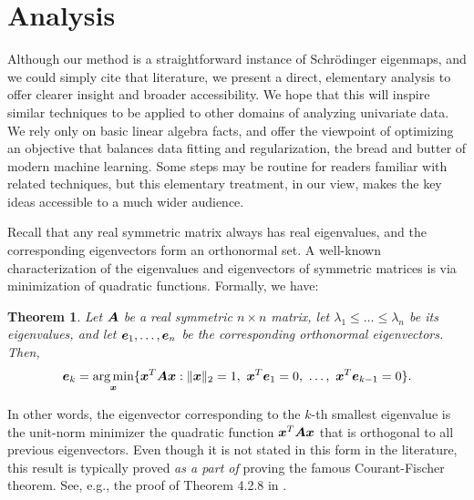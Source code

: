 \documentclass[10pt]{article} %
\newtheorem{theorem}{Theorem}
\begin{document}
\section{Analysis}\label{sec:analysis}
Although our method is a straightforward instance of Schr\"odinger eigenmaps, and we could simply cite that literature, we present a direct, elementary analysis to offer clearer insight and broader accessibility. We hope that this will inspire similar techniques to be applied to other domains of analyzing univariate data. We rely only on basic linear algebra facts, and offer the viewpoint of optimizing an objective that balances data fitting and regularization, the bread and butter of modern machine learning. Some steps may be routine for readers familiar with related techniques, but this elementary treatment, in our view, makes the key ideas accessible to a much wider audience.

Recall that any real symmetric matrix always has real eigenvalues, and the corresponding eigenvectors form an orthonormal set. A well-known characterization of the eigenvalues and eigenvectors of symmetric matrices is via minimization of quadratic functions. Formally, we have:
\begin{theorem}\label{thm:courant_fischer}
Let ${\bm{A}}$ be a real symmetric $n \times n$ matrix, let $\lambda_1 \leq \dots \leq\lambda_n$ be its eigenvalues, and let ${\bm{e}}_1, \dots, {\bm{e}}_n$ be the corresponding orthonormal eigenvectors. Then,
\[
{\bm{e}}_k = \operatorname*{arg\,min}_{{\bm{x}}} \{ {\bm{x}}^T {\bm{A}} {\bm{x}} : \|{\bm{x}}\|_2 = 1,~{\bm{x}}^T {\bm{e}}_1 = 0,~\ldots,~{\bm{x}}^T {\bm{e}}_{k-1} = 0 \}.
\]
\end{theorem}
In other words, the eigenvector corresponding to the $k$-th smallest eigenvalue is the unit-norm minimizer the quadratic function ${\bm{x}}^T {\bm{A}} {\bm{x}}$ that is orthogonal to all previous eigenvectors. Even though it is not stated in this form in the literature, this result is typically proved \emph{as a part of} proving the famous Courant-Fischer theorem. See, e.g., the proof of Theorem 4.2.8 in \citet{horn2012matrix}.
\end{document}
